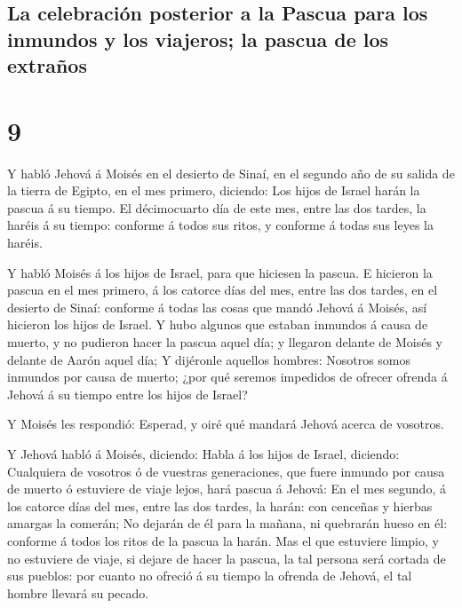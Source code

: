 \hypertarget{la-celebraciuxf3n-posterior-a-la-pascua-para-los-inmundos-y-los-viajeros-la-pascua-de-los-extrauxf1os}{%
\subsection{La celebración posterior a la Pascua para los inmundos y los
viajeros; la pascua de los
extraños}\label{la-celebraciuxf3n-posterior-a-la-pascua-para-los-inmundos-y-los-viajeros-la-pascua-de-los-extrauxf1os}}

\hypertarget{section-04-9}{%
\section{9}\label{section-04-9}}

 Y habló Jehová á Moisés en el desierto de Sinaí, en el
segundo año de su salida de la tierra de Egipto, en el mes primero,
diciendo:  Los hijos de Israel harán la pascua á su
tiempo.  El décimocuarto día de este mes, entre las dos
tardes, la haréis á su tiempo: conforme á todos sus ritos, y conforme á
todas sus leyes la haréis.

 Y habló Moisés á los hijos de Israel, para que hiciesen
la pascua.  E hicieron la pascua en el mes primero, á los
catorce días del mes, entre las dos tardes, en el desierto de Sinaí:
conforme á todas las cosas que mandó Jehová á Moisés, así hicieron los
hijos de Israel.  Y hubo algunos que estaban inmundos á
causa de muerto, y no pudieron hacer la pascua aquel día; y llegaron
delante de Moisés y delante de Aarón aquel día;  Y
dijéronle aquellos hombres: Nosotros somos inmundos por causa de muerto;
¿por qué seremos impedidos de ofrecer ofrenda á Jehová á su tiempo entre
los hijos de Israel?

 Y Moisés les respondió: Esperad, y oiré qué mandará
Jehová acerca de vosotros.

 Y Jehová habló á Moisés, diciendo:  Habla
á los hijos de Israel, diciendo: Cualquiera de vosotros ó de vuestras
generaciones, que fuere inmundo por causa de muerto ó estuviere de viaje
lejos, hará pascua á Jehová:  En el mes segundo, á los
catorce días del mes, entre las dos tardes, la harán: con cenceñas y
hierbas amargas la comerán;  No dejarán de él para la
mañana, ni quebrarán hueso en él: conforme á todos los ritos de la
pascua la harán.  Mas el que estuviere limpio, y no
estuviere de viaje, si dejare de hacer la pascua, la tal persona será
cortada de sus pueblos: por cuanto no ofreció á su tiempo la ofrenda de
Jehová, el tal hombre llevará su pecado.

